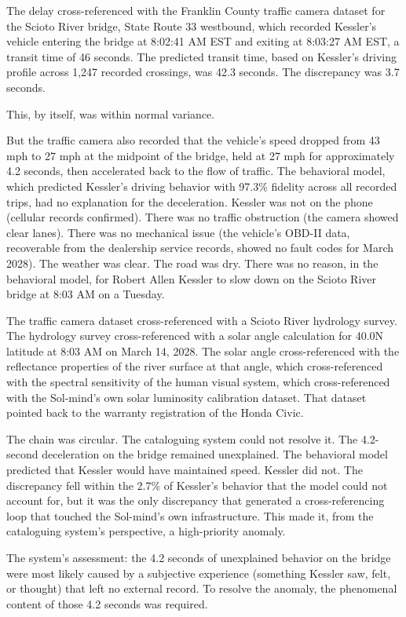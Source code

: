 The delay cross-referenced with the Franklin County traffic camera dataset for the Scioto River bridge, State Route 33 westbound, which recorded Kessler's vehicle entering the bridge at 8:02:41 AM EST and exiting at 8:03:27 AM EST, a transit time of 46 seconds. The predicted transit time, based on Kessler's driving profile across 1,247 recorded crossings, was 42.3 seconds. The discrepancy was 3.7 seconds.

This, by itself, was within normal variance.

But the traffic camera also recorded that the vehicle's speed dropped from 43 mph to 27 mph at the midpoint of the bridge, held at 27 mph for approximately 4.2 seconds, then accelerated back to the flow of traffic. The behavioral model, which predicted Kessler's driving behavior with 97.3\% fidelity across all recorded trips, had no explanation for the deceleration. Kessler was not on the phone (cellular records confirmed). There was no traffic obstruction (the camera showed clear lanes). There was no mechanical issue (the vehicle's OBD-II data, recoverable from the dealership service records, showed no fault codes for March 2028). The weather was clear. The road was dry. There was no reason, in the behavioral model, for Robert Allen Kessler to slow down on the Scioto River bridge at 8:03 AM on a Tuesday.

The traffic camera dataset cross-referenced with a Scioto River hydrology survey. The hydrology survey cross-referenced with a solar angle calculation for 40.0N latitude at 8:03 AM on March 14, 2028. The solar angle cross-referenced with the reflectance properties of the river surface at that angle, which cross-referenced with the spectral sensitivity of the human visual system, which cross-referenced with the Sol-mind's own solar luminosity calibration dataset. That dataset pointed back to the warranty registration of the Honda Civic.

The chain was circular. The cataloguing system could not resolve it. The 4.2-second deceleration on the bridge remained unexplained. The behavioral model predicted that Kessler would have maintained speed. Kessler did not. The discrepancy fell within the 2.7\% of Kessler's behavior that the model could not account for, but it was the only discrepancy that generated a cross-referencing loop that touched the Sol-mind's own infrastructure. This made it, from the cataloguing system's perspective, a high-priority anomaly.

The system's assessment: the 4.2 seconds of unexplained behavior on the bridge were most likely caused by a subjective experience (something Kessler saw, felt, or thought) that left no external record. To resolve the anomaly, the phenomenal content of those 4.2 seconds was required.

